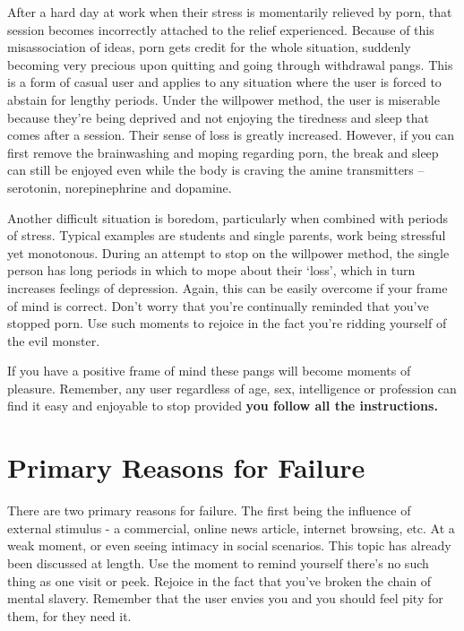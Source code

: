\documentclass[
]{book}
\begin{document}
After a hard day at work when their stress is momentarily relieved by porn, that session becomes incorrectly attached to the relief experienced. Because of this misassociation of ideas, porn gets credit for the whole situation, suddenly becoming very precious upon quitting and going through withdrawal pangs. This is a form of casual user and applies to any situation where the user is forced to abstain for lengthy periods. Under the willpower method, the user is miserable because they're being deprived and not enjoying the tiredness and sleep that comes after a session. Their sense of loss is greatly increased. However, if you can first remove the brainwashing and moping regarding porn, the break and sleep can still be enjoyed even while the body is craving the amine transmitters -- serotonin, norepinephrine and dopamine.

Another difficult situation is boredom, particularly when combined with periods of stress. Typical examples are students and single parents, work being stressful yet monotonous. During an attempt to stop on the willpower method, the single person has long periods in which to mope about their `loss', which in turn increases feelings of depression. Again, this can be easily overcome if your frame of mind is correct. Don't worry that you're continually reminded that you've stopped porn. Use such moments to rejoice in the fact you're ridding yourself of the evil monster.

If you have a positive frame of mind these pangs will become moments of pleasure. Remember, any user regardless of age, sex, intelligence or profession can find it easy and enjoyable to stop provided \textbf{you follow all the instructions.}

\hypertarget{primary-reasons-for-failure}{%
\section{Primary Reasons for Failure}\label{primary-reasons-for-failure}}

There are two primary reasons for failure. The first being the influence of external stimulus - a commercial, online news article, internet browsing, etc. At a weak moment, or even seeing intimacy in social scenarios. This topic has already been discussed at length. Use the moment to remind yourself there's no such thing as one visit or peek. Rejoice in the fact that you've broken the chain of mental slavery. Remember that the user envies you and you should feel pity for them, for they need it.
\end{document}
